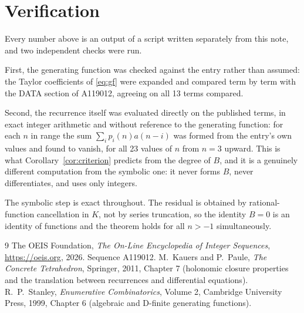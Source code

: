 \documentclass[11pt,a4paper]{article}
\theoremstyle{plain}
\theoremstyle{definition}
\begin{document}
\section{Verification}

Every number above is an output of a script written separately from this note, and two
independent checks were run.

First, the generating function was checked against the entry rather than assumed: the
Taylor coefficients of \eqref{eq:gf} were expanded and compared term by term with the DATA
section of A119012, agreeing on all 13 terms compared.

Second, the recurrence itself was evaluated directly on the published terms, in exact
integer arithmetic and without reference to the generating function: for each $n$ in range
the sum $\sum_{i}p_{i}(n)a(n-i)$ was formed from the entry's own values and found to
vanish, for all 23 values of $n$ from $n=3$ upward. This is what
Corollary~\ref{cor:criterion} predicts from the degree of $B$, and it is a genuinely
different computation from the symbolic one: it never forms $B$, never differentiates, and
uses only integers.

The symbolic step is exact throughout. The residual is obtained by rational-function
cancellation in $K$, not by series truncation, so the identity $B=0$ is an
identity of functions and the theorem holds for all $n>-1$ simultaneously.

\begin{thebibliography}{9}
 The OEIS Foundation, \emph{The On-Line Encyclopedia of Integer Sequences},
\url{https://oeis.org}, 2026. Sequence A119012.
 M.~Kauers and P.~Paule, \emph{The Concrete Tetrahedron}, Springer, 2011,
Chapter 7 (holonomic closure properties and the translation between recurrences and
differential equations).
 R.~P.~Stanley, \emph{Enumerative Combinatorics}, Volume 2, Cambridge
University Press, 1999, Chapter 6 (algebraic and D-finite generating functions).
\end{thebibliography}
\end{document}
